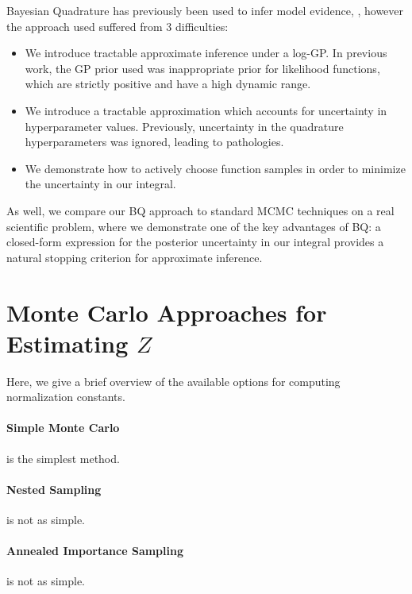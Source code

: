 \documentclass{article}
\begin{document}
Bayesian Quadrature has previously been used to infer model evidence, \citep{BZMonteCarlo}, however the approach used suffered from 3 difficulties: 
\begin{itemize}
\item We introduce tractable approximate inference under a log-GP.  In previous work, the GP prior used was inappropriate prior for likelihood functions, which are strictly positive and have a high dynamic range.
\item We introduce a tractable approximation which accounts for uncertainty in hyperparameter values.  Previously, uncertainty in the quadrature hyperparameters was ignored, leading to pathologies.  
\item We demonstrate how to actively choose function samples in order to minimize the uncertainty in our integral.
\end{itemize}
As well, we compare our BQ approach to standard MCMC techniques on a real scientific problem, where we demonstrate one of the key advantages of BQ: a closed-form expression for the posterior uncertainty in our integral provides a natural stopping criterion for approximate inference.

\section{Monte Carlo Approaches for Estimating $Z$}

Here, we give a brief overview of the available options for computing normalization constants.

\paragraph*{Simple Monte Carlo} is the simplest method.
\paragraph*{Nested Sampling} is not as simple.
\paragraph*{Annealed Importance Sampling} is not as simple.
\citep{neal2001annealed}
\end{document}
